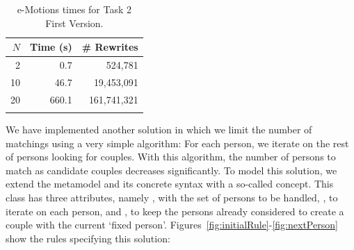 \begin{table}[tb]
\renewcommand{\tabcolsep}{6pt}
\renewcommand{\arraystretch}{1.2}
    \centering
	\begin{tabular}[tb]{r|r|r|}
	$N$ & Time (s) & \# Rewrites \\
	\hline
	2 & 0.7 & 524,781 \\
	10 & 46.7 & 19,453,091 \\
	20 & 660.1 & 161,741,321 \\
	\hline \\
	\end{tabular}
	\caption{e-Motions times for Task 2 First Version.}\label{table:emotionstask1}
\end{table}

We have implemented another solution in which we limit the number of matchings using a very simple algorithm: For each person, we iterate on the rest of persons looking for couples.  
With this algorithm, the number of persons to match as candidate couples decreases significantly. To model this solution, we extend the metamodel and its concrete syntax with a so-called  concept. This class has three attributes, namely , with the set of persons to be handled, , to iterate on each person, and , to keep the persons already considered to create a couple with the current `fixed person'. Figures~\ref{fig:initialRule}-\ref{fig:nextPerson} show the rules specifying this solution: 
